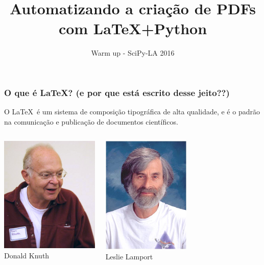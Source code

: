 \documentclass{beamer}
\title{\textcolor{europeanalonis}{Automatizando a criação de PDFs com \LaTeX+Python}} \author[M. Weber Mendonça]
\institute[UFSC]{\inst{1} Universidade Federal de Santa Catarina}
\date{Warm up - SciPy-LA 2016}
\begin{document}
\begin{frame}
  \titlepage
\end{frame}
\begin{frame}
   \frametitle{O que é \LaTeX? \small{(e por que está escrito desse jeito??)}}
   O \LaTeX\ é um sistema de composição tipográfica de alta qualidade, e é o padrão na comunicação e publicação de documentos científicos.
   \begin{columns}
      \column{5cm}
      \begin{center}
         \includegraphics[width=4.7cm]{img/knuth.jpg}\\
         Donald Knuth
      \end{center}
      \column{5cm}
      \begin{center}
         \includegraphics[width=4.2cm]{img/lamport.jpg}\\
         Leslie Lamport
      \end{center}
   \end{columns}
\end{frame}
\end{document}
